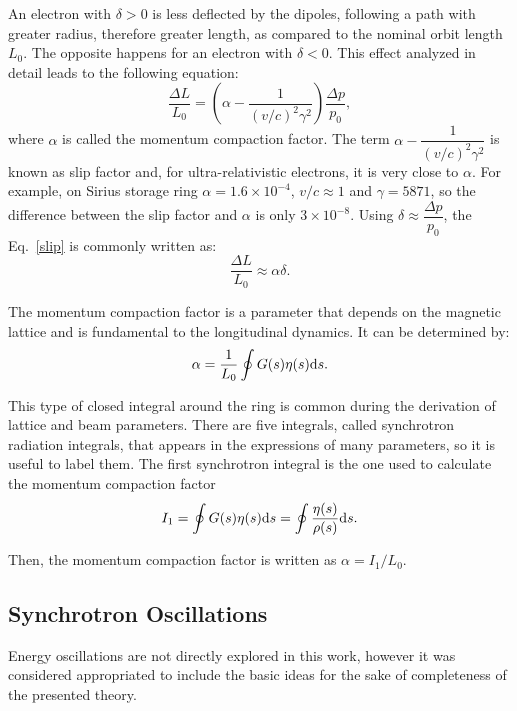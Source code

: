 An electron with $\delta > 0$ is less deflected by the dipoles, following a path with greater radius, therefore greater length, as compared to the nominal orbit length $L_0$. The opposite happens for an electron with $\delta < 0$. This effect analyzed in detail leads to the following equation:
\begin{equation}
    \frac{\Delta L}{L_0} = \left(\alpha - \dfrac{1}{(v/c)^2\gamma^2}\right) \dfrac{\Delta p}{p_0},
    \label{slip}
\end{equation}
where $\alpha$ is called the momentum compaction factor. The term $\alpha - \dfrac{1}{(v/c)^2\gamma^2}$ is known as slip factor and, for ultra-relativistic electrons, it is very close to $\alpha$. For example, on Sirius storage ring $\alpha = 1.6 \times 10^{-4}$, $v/c \approx 1$ and $\gamma = 5871$, so the difference between the slip factor and $\alpha$ is only $3 \times 10^{-8}$. Using $\delta \approx \dfrac{\Delta p}{p_0}$, the Eq.~\eqref{slip} is commonly written as:
\begin{equation}
    \frac{\Delta L}{L_0} \approx \alpha \delta.
    \label{orbitlen}
\end{equation}

The momentum compaction factor is a parameter that depends on the magnetic lattice and is fundamental to the longitudinal dynamics. It can be determined by:
\begin{equation}
    \alpha = \dfrac{1}{L_0}\oint G(s) \eta(s) \mathrm{d} s.
\end{equation}

This type of closed integral around the ring is common during the derivation of lattice and beam parameters. There are five integrals, called synchrotron radiation integrals, that appears in the expressions of many parameters, so it is useful to label them. The first synchrotron integral is the one used to calculate the momentum compaction factor
\begin{equation}
    I_1 = \oint G(s) \eta(s) \mathrm{d} s = \oint \dfrac{\eta(s)}{\rho(s)} \mathrm{d} s.
\end{equation}

Then, the momentum compaction factor is written as $\alpha = I_1/L_0$.
\subsection{Synchrotron Oscillations}
Energy oscillations are not directly explored in this work, however it was considered appropriated to include the basic ideas for the sake of completeness of the presented theory.

